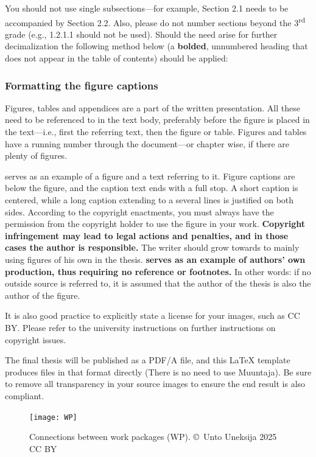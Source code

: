 You should not use single subsections---for example, Section 2.1 needs to be accompanied by Section 2.2. Also, please do not number sections beyond the 3\textsuperscript{rd}  grade (e.g., 1.2.1.1 should not be used). Should the need arise for further decimalization the following method below (a \textbf{bolded}, unnumbered heading that does not appear in the table of contents) should be applied:

\subsubsection{Formatting the figure captions} Figures, tables and appendices are a part of the written presentation. All these need to be referenced to in the text body, preferably before the figure is placed in the text---i.e., first the referring text, then the figure or table. Figures and tables have a running number through the document---or chapter wise, if there are plenty of figures.

 serves as an example of a figure and a text referring to it. Figure captions are below the figure, and the caption text ends with a full stop. A short caption is centered, while a long caption extending to a several lines is justified on both sides. According to the copyright enactments, you must always have the permission from the copyright holder to use the figure in your work. \textbf{Copyright infringement may lead to legal actions and penalties, and in those cases the author is responsible.} The writer should grow towards to mainly using figures of his own in the thesis. \textbf{  serves as an example of authors' own production, thus requiring no reference or footnotes.} In other words: if no outside source is referred to, it is assumed that the author of the thesis is also the author of the figure.

It is also good practice to explicitly state a license for your
images, such as CC BY. Please refer to the university instructions on
further instructions on copyright issues.

The final thesis will be published as a PDF/A file, and this LaTeX
template produces files in that format directly (There is no need to
use Muuntaja). Be sure to remove all transparency in your source
images to ensure the end result is also compliant.

\begin{figure}[ht]
  \begin{center}
    \texttt{[image: WP]}
  \end{center}
  \caption{Connections between work packages (WP). \copyright\ Unto Uneksija 2025 CC BY}
  \label{fig:work_packages}
\end{figure}


